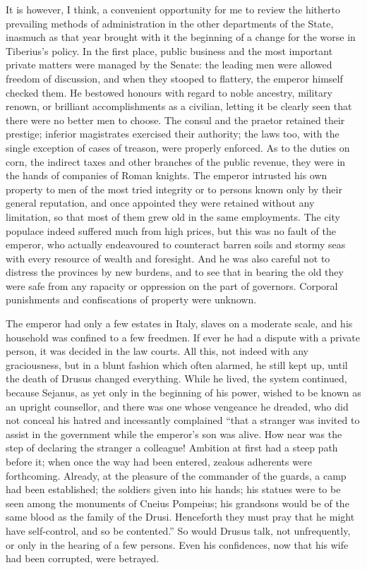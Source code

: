It is however, I think, a convenient opportunity for me to review the hitherto prevailing methods of administration in the other departments of the State, inasmuch as that year brought with it the beginning of a change for the worse in Tiberius's policy. In the first place, public business and the most important private matters were managed by the Senate: the leading men were allowed freedom of discussion, and when they stooped to flattery, the emperor himself checked them. He bestowed honours with regard to noble ancestry, military renown, or brilliant accomplishments as a civilian, letting it be clearly seen that there were no better men to choose. The consul and the praetor retained their prestige; inferior magistrates exercised their authority; the laws too, with the single exception of cases of treason, were properly enforced. As to the duties on corn, the indirect taxes and other branches of the public revenue, they were in the hands of companies of Roman knights. The emperor intrusted his own property to men of the most tried integrity or to persons known only by their general reputation, and once appointed they were retained without any limitation, so that most of them grew old in the same employments. The city populace indeed suffered much from high prices, but this was no fault of the emperor, who actually endeavoured to counteract barren soils and stormy seas with every resource of wealth and foresight. And he was also careful not to distress the provinces by new burdens, and to see that in bearing the old they were safe from any rapacity or oppression on the part of governors. Corporal punishments and confiscations of property were unknown.


The emperor had only a few estates in Italy, slaves on a moderate scale, and his household was confined to a few freedmen. If ever he had a dispute with a private person, it was decided in the law courts. All this, not indeed with any graciousness, but in a blunt fashion which often alarmed, he still kept up, until the death of Drusus changed everything. While he lived, the system continued, because Sejanus, as yet only in the beginning of his power, wished to be known as an upright counsellor, and there was one whose vengeance he dreaded, who did not conceal his hatred and incessantly complained ``that a stranger was invited to assist in the government while the emperor's son was alive. How near was the step of declaring the stranger a colleague! Ambition at first had a steep path before it; when once the way had been entered, zealous adherents were forthcoming. Already, at the pleasure of the commander of the guards, a camp had been established; the soldiers given into his hands; his statues were to be seen among the monuments of Cneius Pompeius; his grandsons would be of the same blood as the family of the Drusi. Henceforth they must pray that he might have self-control, and so be contented.'' So would Drusus talk, not unfrequently, or only in the hearing of a few persons. Even his confidences, now that his wife had been corrupted, were betrayed.


